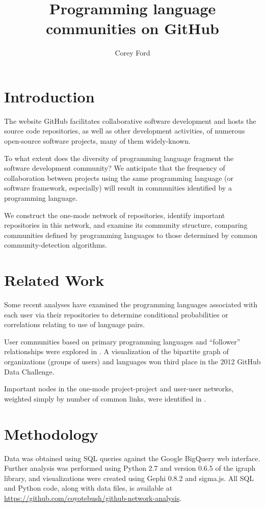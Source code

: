 \documentclass[11pt]{article}
\title{Programming language communities on GitHub}
\author{Corey Ford}
\begin{document}
\maketitle

\section{Introduction}

The website GitHub facilitates collaborative software development and hosts the
source code repositories, as well as other development activities, of numerous
open-source software projects, many of them widely-known.

To what extent does the diversity of programming language fragment the software
development community? We anticipate that the frequency of collaboration between
projects using the same programming language (or software framework, especially)
will result in communities identified by a programming language.

We construct the one-mode network of repositories, identify important
repositories in this network, and examine its community structure, comparing
communities defined by programming languages to those determined by common
community-detection algorithms.

\section{Related Work}
Some recent analyses have examined the programming languages associated with
each user via their repositories to determine conditional probabilities
\cite{doll12} or correlations \cite{shah13} relating to use of language pairs.

User communities based on primary programming languages and ``follower''
relationships were explored in \cite{cuny10,weber12}.  A visualization of the
bipartite graph of organizations (groups of users) and languages
\cite{rodrigues12} won third place in the 2012 GitHub Data Challenge.

Important nodes in the one-mode project-project and user-user networks, weighted
simply by number of common links, were identified in \cite{thung2013}.

\section{Methodology}
Data was obtained using SQL queries against the Google BigQuery web interface.
Further analysis was performed using Python 2.7 and version 0.6.5 of the igraph
library, and visualizations were created using Gephi 0.8.2 and sigma.js. All SQL
and Python code, along with data files, is available at
\url{https://github.com/coyotebush/github-network-analysis}.
\end{document}
